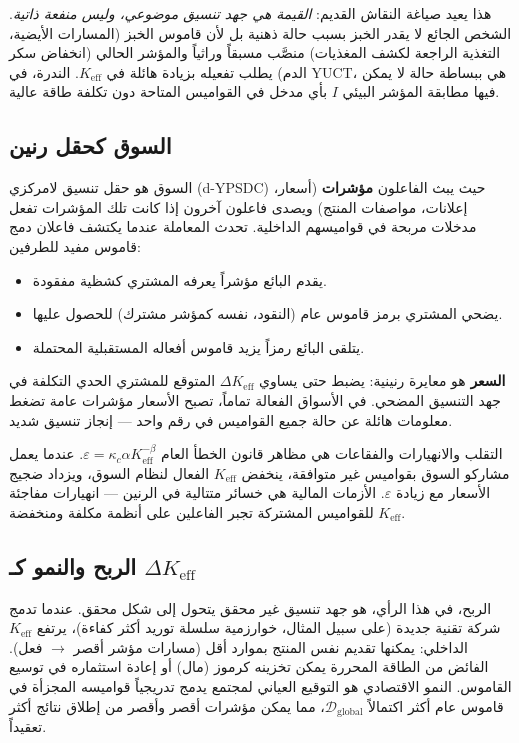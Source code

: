 \documentclass[12pt,a4paper]{article}
\newcommand{\Keff}{K_{\mathrm{eff}}}
\begin{document}
	هذا يعيد صياغة النقاش القديم: \emph{القيمة هي جهد تنسيق موضوعي، وليس منفعة ذاتية}. الشخص الجائع لا يقدر الخبز بسبب حالة ذهنية بل لأن قاموس الخبز (المسارات الأيضية، التغذية الراجعة لكشف المغذيات) منصَّب مسبقاً وراثياً والمؤشر الحالي (انخفاض سكر الدم) يطلب تفعيله بزيادة هائلة في \(K_{\mathrm{eff}}\). الندرة، في YUCT، هي ببساطة حالة لا يمكن فيها مطابقة المؤشر البيئي \(I\) بأي مدخل في القواميس المتاحة دون تكلفة طاقة عالية.
	
	\subsection{السوق كحقل رنين}
	
	السوق هو حقل تنسيق لامركزي (d-YPSDC) حيث يبث الفاعلون \textbf{مؤشرات} (أسعار، إعلانات، مواصفات المنتج) ويصدى فاعلون آخرون إذا كانت تلك المؤشرات تفعل مدخلات مربحة في قواميسهم الداخلية. تحدث المعاملة عندما يكتشف فاعلان دمج قاموس مفيد للطرفين:
	\begin{itemize}[leftmargin=*]
		\item يقدم البائع مؤشراً يعرفه المشتري كشظية مفقودة.
		\item يضحي المشتري برمز قاموس عام (النقود، نفسه كمؤشر مشترك) للحصول عليها.
		\item يتلقى البائع رمزاً يزيد قاموس أفعاله المستقبلية المحتملة.
	\end{itemize}
	\textbf{السعر} هو معايرة رنينية: يضبط حتى يساوي \(\Delta\Keff\) المتوقع للمشتري الحدي التكلفة في جهد التنسيق المضحي. في الأسواق الفعالة تماماً، تصبح الأسعار مؤشرات عامة تضغط معلومات هائلة عن حالة جميع القواميس في رقم واحد — إنجاز تنسيق شديد.
	
	التقلب والانهيارات والفقاعات هي مظاهر قانون الخطأ العام \(\varepsilon = \kappa_c \alpha \Keff^{-\beta}\). عندما يعمل مشاركو السوق بقواميس غير متوافقة، ينخفض \(\Keff\) الفعال لنظام السوق، ويزداد ضجيج الأسعار مع زيادة \(\varepsilon\). الأزمات المالية هي خسائر متتالية في الرنين — انهيارات مفاجئة للقواميس المشتركة تجبر الفاعلين على أنظمة مكلفة ومنخفضة \(\Keff\).
	
	\subsection{الربح والنمو كـ \(\Delta\Keff\)}
	
	الربح، في هذا الرأي، هو جهد تنسيق غير محقق يتحول إلى شكل محقق. عندما تدمج شركة تقنية جديدة (على سبيل المثال، خوارزمية سلسلة توريد أكثر كفاءة)، يرتفع \(\Keff\) الداخلي: يمكنها تقديم نفس المنتج بموارد أقل (مسارات مؤشر أقصر \(\to\) فعل). الفائض من الطاقة المحررة يمكن تخزينه كرموز (مال) أو إعادة استثماره في توسيع القاموس. النمو الاقتصادي هو التوقيع العياني لمجتمع يدمج تدريجياً قواميسه المجزأة في قاموس عام أكثر اكتمالاً \(\mathcal{D}_{\text{global}}\)، مما يمكن مؤشرات أقصر وأقصر من إطلاق نتائج أكثر تعقيداً.
	
\end{document}
